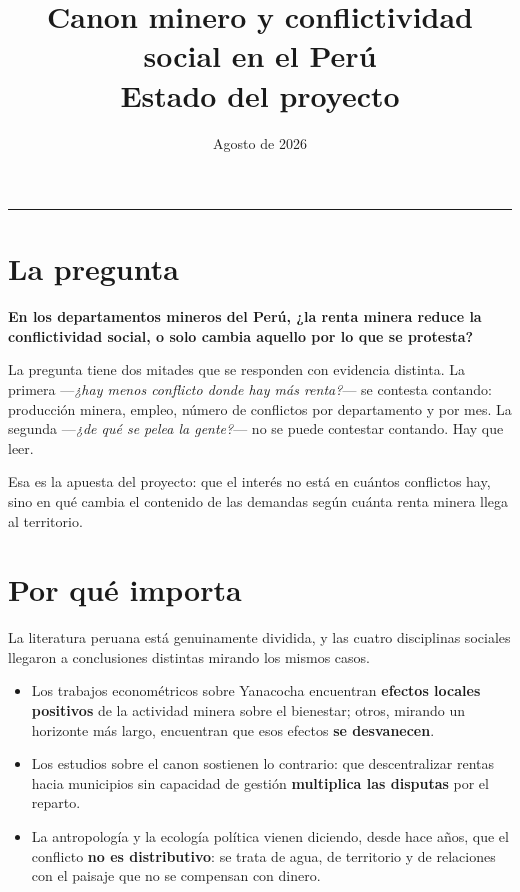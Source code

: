 \documentclass[11pt,a4paper]{article}
\title{\vspace{-1.5cm}\textbf{Canon minero y conflictividad social en el Perú}\\[0.3em]
\large\normalfont Estado del proyecto}
\author{}
\date{Agosto de 2026}
\begin{document}
\maketitle
\vspace{-2em}

\hrule
\vspace{1em}

\section{La pregunta}

\textbf{En los departamentos mineros del Perú, ¿la renta minera reduce la
conflictividad social, o solo cambia aquello por lo que se protesta?}

La pregunta tiene dos mitades que se responden con evidencia distinta. La
primera —\emph{¿hay menos conflicto donde hay más renta?}— se contesta contando:
producción minera, empleo, número de conflictos por departamento y por mes. La
segunda —\emph{¿de qué se pelea la gente?}— no se puede contestar contando. Hay
que leer.

Esa es la apuesta del proyecto: que el interés no está en cuántos conflictos hay,
sino en qué cambia el contenido de las demandas según cuánta renta minera llega
al territorio.

\section{Por qué importa}

La literatura peruana está genuinamente dividida, y las cuatro disciplinas
sociales llegaron a conclusiones distintas mirando los mismos casos.

\begin{itemize}
  \item Los trabajos econométricos sobre Yanacocha encuentran \textbf{efectos
  locales positivos} de la actividad minera sobre el bienestar; otros, mirando un
  horizonte más largo, encuentran que esos efectos \textbf{se desvanecen}.
  \item Los estudios sobre el canon sostienen lo contrario: que descentralizar
  rentas hacia municipios sin capacidad de gestión \textbf{multiplica las
  disputas} por el reparto.
  \item La antropología y la ecología política vienen diciendo, desde hace años,
  que el conflicto \textbf{no es distributivo}: se trata de agua, de territorio y
  de relaciones con el paisaje que no se compensan con dinero.
\end{itemize}
\end{document}
